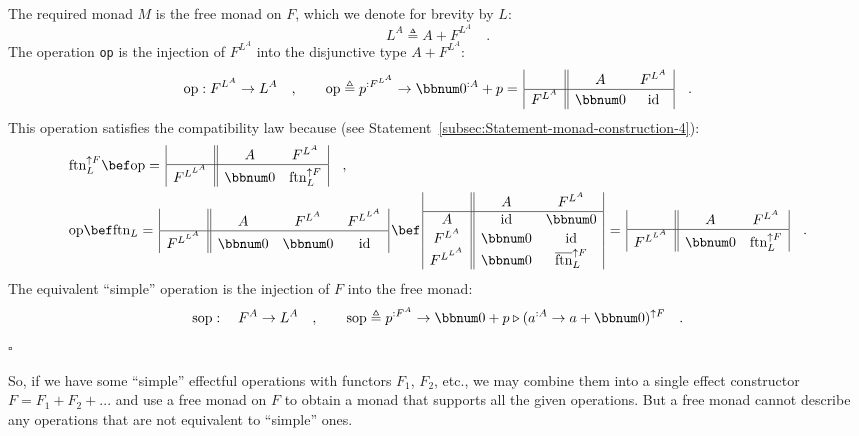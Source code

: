 The required monad $M$ is the free monad on $F$, which we denote
for brevity by $L$:
\[
L^{A}\triangleq A+F^{L^{A}}\quad.
\]
The operation \lstinline!op! is the injection of $F^{L^{A}}$ into
the disjunctive type $A+F^{L^{A}}$:
\[
\text{op}:F^{L^{A}}\rightarrow L^{A}\quad,\quad\quad\text{op}\triangleq p^{:F^{L^{A}}}\rightarrow\bbnum 0^{:A}+p=\,\begin{array}{|c||cc|}
 & A & F^{L^{A}}\\
\hline F^{L^{A}} & \bbnum 0 & \text{id}
\end{array}\quad.
\]
This operation satisfies the compatibility law because (see Statement~\ref{subsec:Statement-monad-construction-4}):
\begin{align*}
 & \text{ftn}_{L}^{\uparrow F}\bef\text{op}=\,\begin{array}{|c||cc|}
 & A & F^{L^{A}}\\
\hline F^{L^{L^{A}}} & \bbnum 0 & \text{ftn}_{L}^{\uparrow F}
\end{array}\quad,\\
 & \text{op}\bef\text{ftn}_{L}=\,\begin{array}{|c||ccc|}
 & A & F^{L^{A}} & F^{L^{L^{A}}}\\
\hline F^{L^{L^{A}}} & \bbnum 0 & \bbnum 0 & \text{id}
\end{array}\,\bef\,\begin{array}{|c||cc|}
 & A & F^{L^{A}}\\
\hline A & \text{id} & \bbnum 0\\
F^{L^{A}} & \bbnum 0 & \text{id}\\
F^{L^{L^{A}}} & \bbnum 0 & \overline{\text{ftn}}_{L}^{\uparrow F}
\end{array}\,=\,\begin{array}{|c||cc|}
 & A & F^{L^{A}}\\
\hline F^{L^{L^{A}}} & \bbnum 0 & \text{ftn}_{L}^{\uparrow F}
\end{array}\quad.
\end{align*}
The equivalent \textsf{``}simple\textsf{''} operation is the injection of $F$ into
the free monad:
\[
\text{sop}:\quad F^{A}\rightarrow L^{A}\quad,\quad\quad\text{sop}\triangleq p^{:F^{A}}\rightarrow\bbnum 0+p\triangleright(a^{:A}\rightarrow a+\bbnum 0)^{\uparrow F}\quad.
\]
$\square$

So, if we have some \textsf{``}simple\textsf{''} effectful operations with functors
$F_{1}$, $F_{2}$, etc., we may combine them into a single effect
constructor $F=F_{1}+F_{2}+...$ and use a free monad on $F$ to obtain
a monad that supports all the given operations. But a free monad cannot
describe any operations that are not equivalent to \textsf{``}simple\textsf{''} ones.

